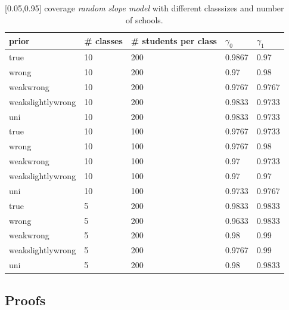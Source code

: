\begin{table}[H]
\begin{center}
\begin{tabular}{l l l l  l}
prior & \# classes & \#  students per class &  $\gamma_0$ & $ \gamma_1$ \\
\hline
true & 10  &  200  &  0.9867  &  0.97\\
wrong & 10  &  200  &  0.97  &  0.98\\
weakwrong & 10  &  200  &  0.9767  &  0.9767\\
weakslightlywrong & 10  &  200  &  0.9833  &  0.9733\\
uni & 10  &  200  &  0.9833  &  0.9733\\
\hline
true &10  &  100  &  0.9767  &  0.9733\\
wrong & 10  &  100  &  0.9767  &  0.98\\
weakwrong & 10  &  100  &  0.97  &  0.9733 \\
weakslightlywrong &10  &  100  &  0.97  &  0.97\\
uni &10  &  100  &  0.9733  &  0.9767\\
\hline
true & 5  &  200  &  0.9833  &  0.9833\\
wrong & 5  &  200  &  0.9633  &  0.9833\\
weakwrong & 5  &  200  &  0.98  &  0.99\\
weakslightlywrong &5  &  200  &  0.9767  &  0.99\\
uni &5  &  200  &  0.98  &  0.9833\\
\end{tabular}
\end{center}
\caption{[0.05,0.95] coverage \emph{random slope model}  with different classsizes and number of schools. }
\label{tab:coverage}
\end{table}


\subsection{Proofs}

